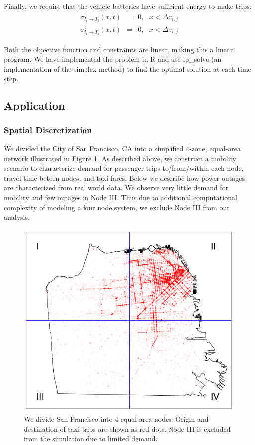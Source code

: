 \documentclass[conference]{IEEEtran}
\begin{document}
Finally, we require that the vehicle batteries have sufficient energy to make trips:
\begin{eqnarray*}
    \sigma_{I_i \rightarrow I_j}^\prime(x,t) & = & 0, ~~~ x < \Delta x_{i,j} \\
    \sigma_{I_i \rightarrow I_j}^o(x,t) & = & 0, ~~~ x < \Delta x_{i,j}
\end{eqnarray*}

Both the objective function and constraints are linear, making this a linear program. We have implemented the problem in R and use lp\_solve (an implementation of the simplex method) to find the optimal solution at each time step.

\subsection{Application}
\subsubsection{Spatial Discretization}
We divided the City of San Francisco, CA into a simplified 4-zone, equal-area network illustrated in Figure \ref{fig:sf}. As described above, we construct a mobility scenario to characterize demand for passenger trips to/from/within each node, travel time beteen nodes, and taxi fares. Below we describe how power outages are characterized from real world data. We observe very little demand for mobility and few outages in Node III. Thus due to additional computational complexity of modeling a four node system, we exclude Node III from our analysis.
\begin{figure}[!htbp]
  \begin{center}
  \includegraphics[width=0.6\linewidth]{plots/grid1-cropped.png}
  \end{center}
  \vspace{-5pt}
  \caption{We divide San Francisco into 4 equal-area nodes. Origin and destination of taxi trips are shown as red dots. Node III is excluded from the simulation due to limited demand.}
  \label{fig:sf}
\end{figure}
\end{document}
